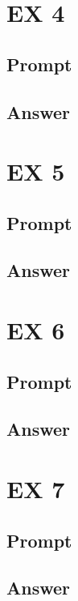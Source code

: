 \documentclass[10pt,a4paper]{article}
\begin{document}
\section{EX 4}
\subsection{Prompt}
\subsection{Answer}

\section{EX 5}
\subsection{Prompt}
\subsection{Answer}

\section{EX 6}
\subsection{Prompt}
\subsection{Answer}

\section{EX 7}
\subsection{Prompt}
\subsection{Answer}
\end{document}
